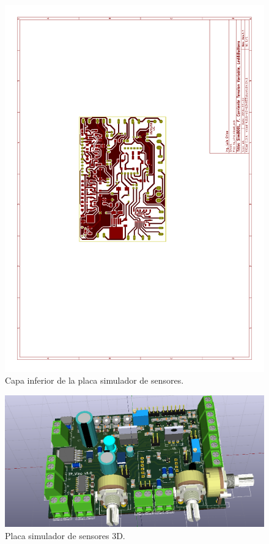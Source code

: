 \begin{figure}[!hp]
  \centering
  \includegraphics[page=2,angle=270,clip,trim=5.5cm 10cm 7.7cm 8.5cm]{./Figures/pcb_layer.pdf}
  \caption{Capa inferior de la placa simulador de sensores.}
  \label{fig:layer_inf}
\end{figure}

\begin{figure}[!hp]
  \centering
  \includegraphics[scale=0.3]{./Figures/pcb_3d.png}
  \caption{Placa simulador de sensores 3D.}
  \label{fig:pcb3d}
\end{figure}

